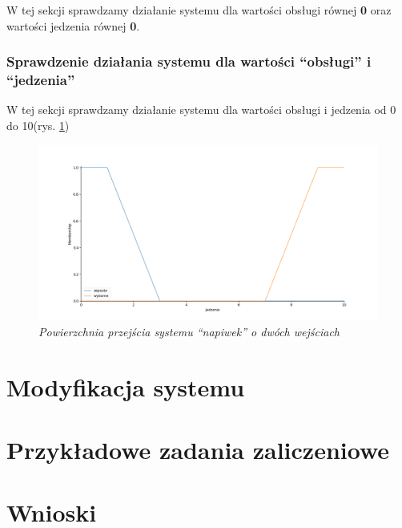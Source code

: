 \documentclass[a4paper, 10pt]{article}
\begin{document}
W tej sekcji sprawdzamy działanie systemu dla wartości obsługi równej \textbf{0} oraz wartości jedzenia równej \textbf{0}.

\subsubsection{Sprawdzenie działania systemu dla wartości ``obsługi'' i ``jedzenia''}\label{p12}

W tej sekcji sprawdzamy działanie systemu dla wartości obsługi i jedzenia od 0 do 10(rys. \ref{fig:napiwek_obsluga_jedzenie})

\begin{figure}[H]
	\centering
	\includegraphics[scale=0.25]{Figure_6.png}
	\caption{\textit{Powierzchnia przejścia systemu ``napiwek'' o dwóch wejściach}}
	\label{fig:napiwek_obsluga_jedzenie}
\end{figure}


\section{Modyfikacja systemu}\label{sec:c2}

\section{Przykładowe zadania zaliczeniowe}\label{sec:c3}
 
\section{Wnioski}
\end{document}
